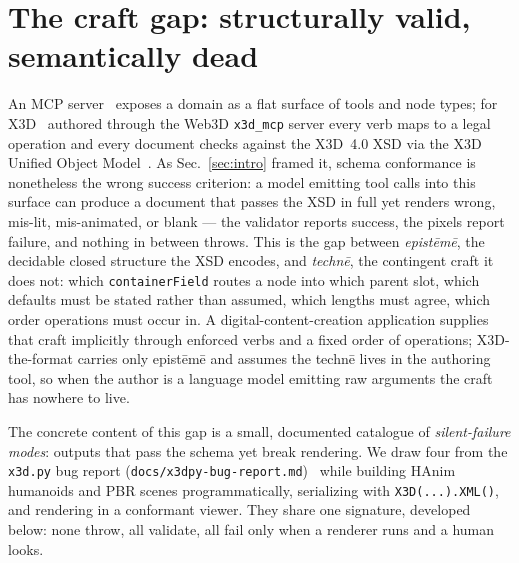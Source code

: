 \documentclass[sigconf,nonacm,screen,anonymous]{acmart}
\begin{document}
\section{The craft gap: structurally valid, semantically dead}\label{sec:gap}

An MCP server~\cite{mcp} exposes a domain as a flat surface of tools and node types; for X3D~\cite{x3d4} authored through the Web3D \texttt{x3d\_mcp} server every verb maps to a legal operation and every document checks against the X3D~4.0 XSD via the X3D Unified Object Model~\cite{x3duom}. As Sec.~\ref{sec:intro} framed it, schema conformance is nonetheless the wrong success criterion: a model emitting tool calls into this surface can produce a document that passes the XSD in full yet renders wrong, mis-lit, mis-animated, or blank --- the validator reports success, the pixels report failure, and nothing in between throws. This is the gap between \emph{epistēmē}, the decidable closed structure the XSD encodes, and \emph{technē}, the contingent craft it does not: which \texttt{containerField} routes a node into which parent slot, which defaults must be stated rather than assumed, which lengths must agree, which order operations must occur in. A digital-content-creation application supplies that craft implicitly through enforced verbs and a fixed order of operations; X3D-the-format carries only epistēmē and assumes the technē lives in the authoring tool, so when the author is a language model emitting raw arguments the craft has nowhere to live.

The concrete content of this gap is a small, documented catalogue of \emph{silent-failure modes}: outputs that pass the schema yet break rendering. We draw four from the \texttt{x3d.py} bug report (\texttt{docs/x3dpy-bug-report.md})~\cite{x3dpy} while building HAnim humanoids and PBR scenes programmatically, serializing with \texttt{X3D(...).XML()}, and rendering in a conformant viewer. They share one signature, developed below: none throw, all validate, all fail only when a renderer runs and a human looks.
\end{document}

